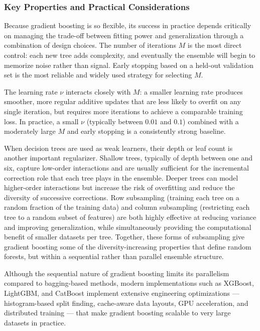 \subsubsection*{Key Properties and Practical Considerations}

Because gradient boosting is so flexible, its success in practice depends critically on managing the trade-off between fitting power and generalization through a combination of design choices. The number of iterations $M$ is the most direct control: each new tree adds complexity, and eventually the ensemble will begin to memorize noise rather than signal. Early stopping based on a held-out validation set is the most reliable and widely used strategy for selecting $M$.

The learning rate $\nu$ interacts closely with $M$: a smaller learning rate produces smoother, more regular additive updates that are less likely to overfit on any single iteration, but requires more iterations to achieve a comparable training loss. In practice, a small $\nu$ (typically between $0.01$ and $0.1$) combined with a moderately large $M$ and early stopping is a consistently strong baseline.

When decision trees are used as weak learners, their depth or leaf count is another important regularizer. Shallow trees, typically of depth between one and six, capture low-order interactions and are usually sufficient for the incremental correction role that each tree plays in the ensemble. Deeper trees can model higher-order interactions but increase the risk of overfitting and reduce the diversity of successive corrections. Row subsampling (training each tree on a random fraction of the training data) and column subsampling (restricting each tree to a random subset of features) are both highly effective at reducing variance and improving generalization, while simultaneously providing the computational benefit of smaller datasets per tree. Together, these forms of subsampling give gradient boosting some of the diversity-increasing properties that define random forests, but within a sequential rather than parallel ensemble structure.

Although the sequential nature of gradient boosting limits its parallelism compared to bagging-based methods, modern implementations such as XGBoost, LightGBM, and CatBoost implement extensive engineering optimizations --- histogram-based split finding, cache-aware data layouts, GPU acceleration, and distributed training --- that make gradient boosting scalable to very large datasets in practice.


